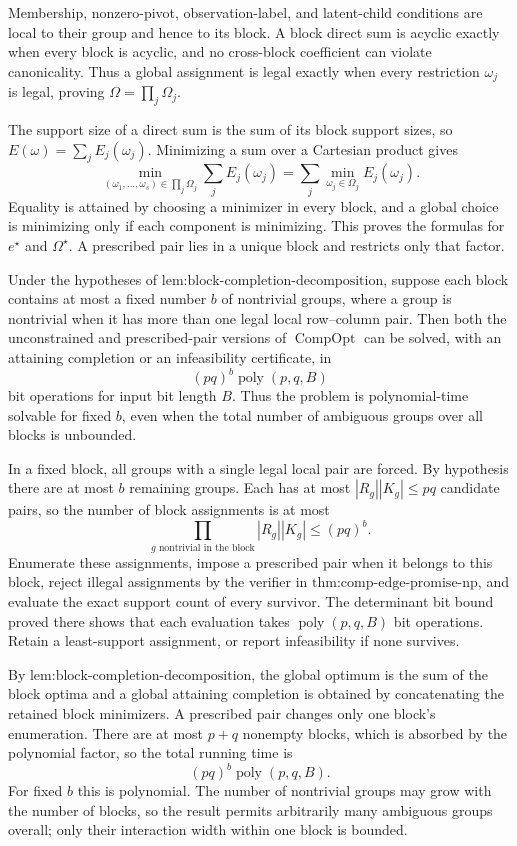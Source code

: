 Membership, nonzero-pivot, observation-label, and latent-child conditions are local to their group and hence to its block.  A block direct sum is acyclic exactly when every block is acyclic, and no cross-block coefficient can violate canonicality.  Thus a global assignment is legal exactly when every restriction \(\omega_j\) is legal, proving \(\Omega=\prod_j\Omega_j\).

The support size of a direct sum is the sum of its block support sizes, so \(E(\omega)=\sum_jE_j(\omega_j)\).  Minimizing a sum over a Cartesian product gives
\[
\min_{(\omega_1,\ldots,\omega_s)\in\prod_j\Omega_j}
\sum_jE_j(\omega_j)=\sum_j\min_{\omega_j\in\Omega_j}E_j(\omega_j).
\]
Equality is attained by choosing a minimizer in every block, and a global choice is minimizing only if each component is minimizing.  This proves the formulas for \(e^\star\) and \(\Omega^\star\).  A prescribed pair lies in a unique block and restricts only that factor.

Under the hypotheses of \(\text{lem:block-completion-decomposition}\), suppose each block contains at most a fixed number \(b\) of nontrivial groups, where a group is nontrivial when it has more than one legal local row--column pair.  Then both the unconstrained and prescribed-pair versions of \(\operatorname{CompOpt}\) can be solved, with an attaining completion or an infeasibility certificate, in
\[
(pq)^b\operatorname{poly}(p,q,B)
\]
bit operations for input bit length \(B\).  Thus the problem is polynomial-time solvable for fixed \(b\), even when the total number of ambiguous groups over all blocks is unbounded.

In a fixed block, all groups with a single legal local pair are forced.  By hypothesis there are at most \(b\) remaining groups.  Each has at most \(|R_g||K_g|\le pq\) candidate pairs, so the number of block assignments is at most
\[
\prod_{g\text{ nontrivial in the block}}|R_g||K_g|
\le(pq)^b.
\]
Enumerate these assignments, impose a prescribed pair when it belongs to this block, reject illegal assignments by the verifier in \(\text{thm:comp-edge-promise-np}\), and evaluate the exact support count of every survivor.  The determinant bit bound proved there shows that each evaluation takes \(\operatorname{poly}(p,q,B)\) bit operations.  Retain a least-support assignment, or report infeasibility if none survives.

By \(\text{lem:block-completion-decomposition}\), the global optimum is the sum of the block optima and a global attaining completion is obtained by concatenating the retained block minimizers.  A prescribed pair changes only one block's enumeration.  There are at most \(p+q\) nonempty blocks, which is absorbed by the polynomial factor, so the total running time is
\[
(pq)^b\operatorname{poly}(p,q,B).
\]
For fixed \(b\) this is polynomial.  The number of nontrivial groups may grow with the number of blocks, so the result permits arbitrarily many ambiguous groups overall; only their interaction width within one block is bounded.

